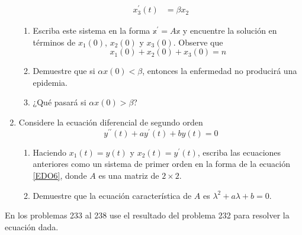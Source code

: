 \begin{enumerate}[start=227]
\begin{align*}
        x_{3}^{\prime}(t) & = \beta x_{2}
    \end{align*}
    \begin{enumerate}
        \item Escriba este sistema en la forma $\mathbb{x}^{\prime}=A \mathbb{x}$ y encuentre la solución en términos de $x_{1}(0)$, $x_{2}(0)$ y $x_{3}(0)$. Observe que
        $$x_{1}(0)+x_{2}(0)+x_{3}(0)=n$$
        \item Demuestre que si $\alpha x(0) < \beta$, entonces la enfermedad no producirá una epidemia.
        \item ¿Qué pasará si $\alpha x(0) > \beta$?
    \end{enumerate}
    \item Considere la ecuación diferencial de segundo orden
    $$y^{\prime \prime}(t)+a y^{\prime}(t)+b y(t)=0$$
    \begin{enumerate}
        \item Haciendo $x_{1}(t)=y(t)$ y $x_{2}(t)=y^{\prime}(t)$, escriba las ecuaciones anteriores como un sistema de primer orden en la forma de la ecuación \eqref{EDO6}, donde $A$ es una matriz de $2 \times 2$.
        \item Demuestre que la ecuación característica de $A$ es $\lambda^{2}+a \lambda+b=0$.
    \end{enumerate}
\end{enumerate}
En los problemas 233 al 238 use el resultado del problema 232 para resolver la ecuación dada.
